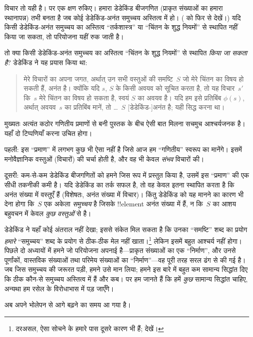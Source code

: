 \documentclass[../../../include/open-logic-section]{subfiles}
\begin{document}
विचार तो यही है। पर एक क्षण रुकिए। हमारा डेडेकिंड बीजगणित (प्राकृत संख्याओं का
हमारा स्थानापन्न) तभी बनता है जब कोई डेडेकिंड-अनंत समुच्चय अस्तित्व में हो।
( को फिर से देखें।)
यदि किसी डेडेकिंड-अनंत समुच्चय का अस्तित्व ``तर्कशास्त्र'' या ``चिंतन के शुद्ध
नियमों'' से स्थापित नहीं किया जा सकता, तो परियोजना यहीं रुक जाती है।

तो क्या किसी डेडेकिंड-अनंत समुच्चय का अस्तित्व ``चिंतन के शुद्ध नियमों'' से
स्थापित \emph{किया जा सकता है}? डेडेकिंड ने यह प्रयास किया था:
\begin{quote}
  मेरे विचारों का अपना जगत, अर्थात् उन सभी वस्तुओं की समष्टि~$S$ जो मेरे
  चिंतन का विषय हो सकती हैं, अनंत है। क्योंकि यदि $s$, $S$ के किसी अवयव को
  सूचित करता है, तो यह विचार~$s'$ कि~$s$ मेरे चिंतन का विषय हो सकता है, स्वयं
  $S$ का अवयव है। यदि हम इसे प्रतिबिंब $\phi(s)$, अर्थात् अवयव~$s$ का
  प्रतिबिंब मानें, तो
  \dots~$S$ [डेडेकिंड-]अनंत है; यही सिद्ध करना था।
	\citep[\S66]{Dedekind1888}
\end{quote}
मुख्यतः अत्यंत कठोर गणितीय प्रमाणों से बनी पुस्तक के बीच ऐसी बात मिलना सचमुच
आश्चर्यजनक है। यहाँ दो टिप्पणियाँ करना उचित होगा।

पहली: इस ``प्रमाण'' में लगभग कुछ भी ऐसा नहीं है जिसे आज हम ``गणितीय'' स्वरूप
का मानेंगे। इसमें मनोवैज्ञानिक वस्तुओं (विचारों) की चर्चा होती है, और वह भी
केवल \emph{संभव} विचारों की।

दूसरी: कम-से-कम डेडेकिंड बीजगणितों को हमने जिस रूप में प्रस्तुत किया है, उसमें
इस ``प्रमाण'' की एक सीधी तकनीकी कमी है। यदि डेडेकिंड का तर्क सफल है, तो वह
केवल इतना स्थापित करता है कि अनंत संख्या में वस्तुएँ हैं (विशेषतः, अनंत संख्या
में विचार)। किंतु डेडेकिंड को यह मानने का कारण भी देना होगा कि~$S$ एक अकेला
\emph{समुच्चय} है जिसके !!{element} अनंत संख्या में हैं, न कि~$S$ का आशय
बहुवचन में केवल \emph{कुछ वस्तुओं} से है।

डेडेकिंड ने यहाँ कोई अंतराल नहीं देखा; इससे संकेत मिल सकता है कि उनका
``समष्टि'' शब्द का प्रयोग \emph{हमारे} ``समुच्चय'' शब्द के प्रयोग से ठीक-ठीक
मेल नहीं खाता।\footnote{दरअसल, ऐसा सोचने के हमारे पास दूसरे कारण भी हैं;
\citet[पृ.~23]{Potter2004} देखें।} लेकिन इसमें बहुत आश्चर्य नहीं होगा। पिछले
दो अध्यायों में हमने जो परियोजना अपनाई है---प्राकृत संख्याओं का एक
``निर्माण'', और उनसे पूर्णांकों, वास्तविक संख्याओं तथा परिमेय संख्याओं का
``निर्माण''---वह पूरी तरह सरल ढंग से की गई है। जब जिस समुच्चय की जरूरत पड़ी,
हमने उसे मान लिया; हमने इस बारे में बहुत कम सामान्य सिद्धांत दिए कि ठीक कौन-से
समुच्चय अस्तित्व में हैं और कब। पर हम जानते हैं कि हमें \emph{कुछ} सामान्य
सिद्धांत चाहिए, अन्यथा हम रसेल के विरोधाभास में पड़ जाएँगे।

अब अपने भोलेपन से आगे बढ़ने का समय आ गया है।
\end{document}
